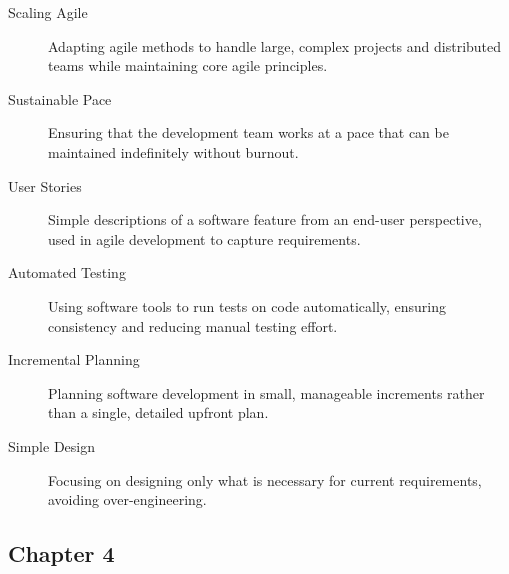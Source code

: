 \documentclass{article}
\begin{document}
\begin{description}
  \item[Scaling Agile] Adapting agile methods to handle large, complex projects and distributed teams while maintaining core agile principles.
  
  \item[Sustainable Pace] Ensuring that the development team works at a pace that can be maintained indefinitely without burnout.
  
  \item[User Stories] Simple descriptions of a software feature from an end-user perspective, used in agile development to capture requirements.
  
  \item[Automated Testing] Using software tools to run tests on code automatically, ensuring consistency and reducing manual testing effort.
  
  \item[Incremental Planning] Planning software development in small, manageable increments rather than a single, detailed upfront plan.
  
  \item[Simple Design] Focusing on designing only what is necessary for current requirements, avoiding over-engineering.
\end{description}


\subsection{Chapter 4}
\end{document}
